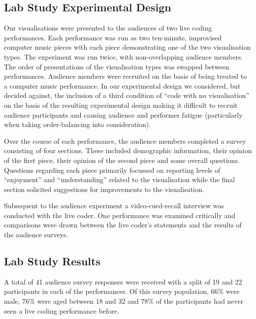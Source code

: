\documentclass{sig-alternate}
\begin{document}
\subsection{Lab Study Experimental Design}


Our visualisations were presented to the audiences of two live coding
performances. Each performance was run as two ten-minute, improvised
computer music pieces with each piece demonstrating one of the two
visualisation types. The experiment was run twice, with
non-overlapping audience members. The order of presentations of the
visualisation types was swapped between performances. Audience members
were recruited on the basis of being treated to a computer music
performance. In our experimental design we considered, but decided
against, the inclusion of a third condition of ``code with no
visualisation'' on the basis of the resulting experimental design
making it difficult to recruit audience participants and causing
audience and performer fatigue (particularly when taking
order-balancing into consideration).

Over the course of each performance, the audience members completed a
survey consisting of four sections. These included demographic
information, their opinion of the first piece, their opinion of the
second piece and some overall questions. Questions regarding each
piece primarily focussed on reporting levels of ``enjoyment'' and
``understanding'' related to the visualisation while the final section
solicited suggestions for improvements to the visualisation.

Subsequent to the audience experiment a video-cued-recall interview
was conducted with the live coder. One performance was examined
critically and comparisons were drawn between the live coder's
statements and the results of the audience surveys.

\subsection{Lab Study Results}

A total of 41 audience survey responses were received with a split of
19 and 22 participants in each of the performances. Of this survey
population, $66\%$ were male, $76\%$ were aged between 18 and 32 and
$78\%$ of the participants had never seen a live coding performance
before.
\end{document}
